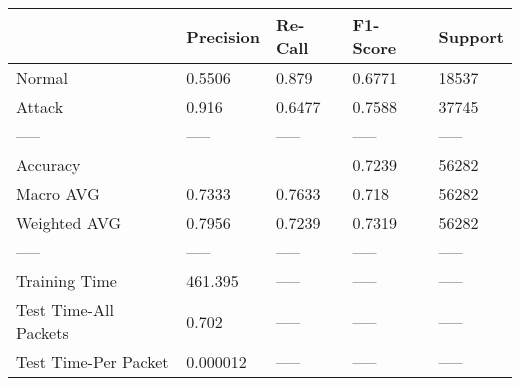 \begin{tabular}{lllll}
\toprule
{} & Precision & Re-Call & F1-Score & Support \\
\midrule
Normal                &    0.5506 &   0.879 &   0.6771 &   18537 \\
Attack                &     0.916 &  0.6477 &   0.7588 &   37745 \\
-----                 &     ----- &   ----- &    ----- &   ----- \\
Accuracy              &           &         &   0.7239 &   56282 \\
Macro AVG             &    0.7333 &  0.7633 &    0.718 &   56282 \\
Weighted AVG          &    0.7956 &  0.7239 &   0.7319 &   56282 \\
-----                 &     ----- &   ----- &    ----- &   ----- \\
Training Time         &   461.395 &   ----- &    ----- &   ----- \\
Test Time-All Packets &     0.702 &   ----- &    ----- &   ----- \\
Test Time-Per Packet  &  0.000012 &   ----- &    ----- &   ----- \\
\bottomrule
\end{tabular}
